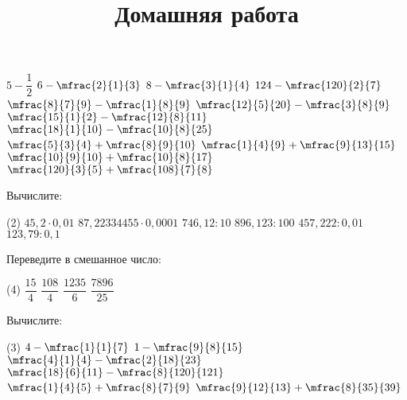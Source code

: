 \begin{class}[number=1]
\begin{listofex}
\begin{tasks}
			\task \( 5-\dfrac{1}{2} \)
			\task \( 6-\mfrac{2}{1}{3} \)
			\task \( 8-\mfrac{3}{1}{4} \)
			\task \( 124-\mfrac{120}{2}{7} \)
			\task \( \mfrac{8}{7}{9}-\mfrac{1}{8}{9} \)
			\task \( \mfrac{12}{5}{20}-\mfrac{3}{8}{9} \)
			\task \( \mfrac{15}{1}{2}-\mfrac{12}{8}{11} \)
			\task \( \mfrac{18}{1}{10}-\mfrac{10}{8}{25} \)
			\task \( \mfrac{5}{3}{4}+\mfrac{8}{9}{10} \)
			\task \( \mfrac{1}{4}{9}+\mfrac{9}{13}{15} \)
			\task \( \mfrac{10}{9}{10}+\mfrac{10}{8}{17} \)
			\task \( \mfrac{120}{3}{5}+\mfrac{108}{7}{8} \)
		\end{tasks}
	\end{listofex}
	\newpage
	\title{Домашняя работа}
	\begin{listofex}
		\item Вычислите:
		\begin{tasks}(2)
			\task \( 45,2\cdot0,01 \)
			\task \( 87,22334455\cdot0,0001 \)
			\task \( 746,12:10 \)
			\task \( 896,123:100 \)
			\task \( 457,222:0,01 \)
			\task \( 123,79:0,1 \)
		\end{tasks}
		\item Переведите в смешанное число:
		\begin{tasks}(4)
			\task \( \dfrac{15}{4} \)
			\task \( \dfrac{108}{4} \)
			\task \( \dfrac{1235}{6} \)
			\task \( \dfrac{7896}{25} \)
		\end{tasks}
		\item Вычислите:
		\begin{tasks}(3)
			\task \( 4-\mfrac{1}{1}{7} \)
			\task \( 1-\mfrac{9}{8}{15} \)
			\task \( \mfrac{4}{1}{4}-\mfrac{2}{18}{23} \)
			\task \( \mfrac{18}{6}{11}-\mfrac{8}{120}{121} \)
			\task \( \mfrac{1}{4}{5}+\mfrac{8}{7}{9} \)
			\task \( \mfrac{9}{12}{13}+\mfrac{8}{35}{39} \)
		\end{tasks}
	\end{listofex}
\end{class}

